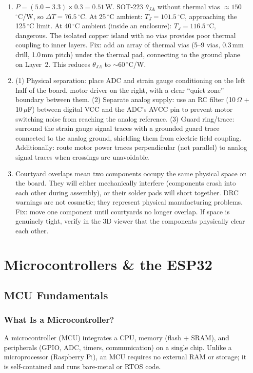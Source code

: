 \documentclass[11pt,letterpaper,twoside,openany]{book}
\newcommand{\degC}{\ensuremath{{}^{\circ}\text{C}}}
\begin{document}
\begin{enumerate}[leftmargin=1.5em]
\item $P = (5.0 - 3.3) \times 0.3 = 0.51$\,W. SOT-223 $\theta_{JA}$ without thermal vias $\approx 150$\,\degC{}/W, so $\Delta T = 76.5$\,\degC{}. At 25\,\degC{} ambient: $T_J = 101.5$\,\degC{}, approaching the 125\,\degC{} limit. At 40\,\degC{} ambient (inside an enclosure): $T_J = 116.5$\,\degC{}, dangerous. The isolated copper island with no vias provides poor thermal coupling to inner layers. Fix: add an array of thermal vias (5--9 vias, 0.3\,mm drill, 1.0\,mm pitch) under the thermal pad, connecting to the ground plane on Layer~2. This reduces $\theta_{JA}$ to $\sim$60\,\degC{}/W.
\item (1) Physical separation: place ADC and strain gauge conditioning on the left half of the board, motor driver on the right, with a clear ``quiet zone'' boundary between them. (2) Separate analog supply: use an RC filter (10\,$\Omega$ + 10\,$\mu$F) between digital VCC and the ADC's AVCC pin to prevent motor switching noise from reaching the analog reference. (3) Guard ring/trace: surround the strain gauge signal traces with a grounded guard trace connected to the analog ground, shielding them from electric field coupling. Additionally: route motor power traces perpendicular (not parallel) to analog signal traces when crossings are unavoidable.
\item Courtyard overlaps mean two components occupy the same physical space on the board. They will either mechanically interfere (components crash into each other during assembly), or their solder pads will short together. DRC warnings are not cosmetic; they represent physical manufacturing problems. Fix: move one component until courtyards no longer overlap. If space is genuinely tight, verify in the 3D viewer that the components physically clear each other.
\end{enumerate}


\chapter{Microcontrollers \& the ESP32}

\vspace{1em}


\vspace{1em}

\section{MCU Fundamentals}
\subsection{What Is a Microcontroller?}
A microcontroller (MCU) integrates a CPU, memory (flash + SRAM), and peripherals (GPIO, ADC, timers, communication) on a single chip. Unlike a microprocessor (Raspberry Pi), an MCU requires no external RAM or storage; it is self-contained and runs bare-metal or RTOS code.
\end{document}
